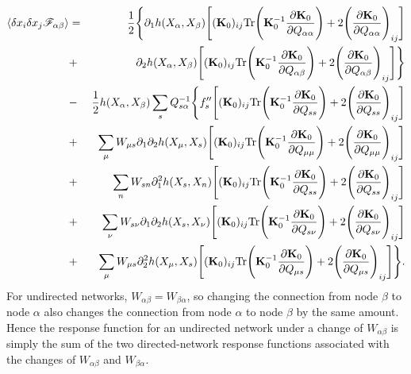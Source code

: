 \begin{eqnarray}
    \langle \delta x_i  \delta x_j{\mathscr F}_{\alpha\beta}\rangle &=&\frac{1}{2}\Bigg\{ \partial_1h(X_\alpha,X_\beta)\Bigg[ ({\bf K}_0)_{ij}\text{Tr}\Bigg({\bf K}_0^{-1} \frac{\partial {\bf K}_0}{\partial Q_{\alpha\alpha}} \Bigg) + 2\Bigg( \frac{\partial {\bf K}_0}{\partial Q_{\alpha\alpha}} \Bigg)_{ij} \Bigg]\\
    &+&\partial_2h(X_\alpha,X_\beta)\Bigg[ ({\bf K}_0)_{ij}\text{Tr}\Bigg({\bf K}_0^{-1} \frac{\partial {\bf K}_0}{\partial Q_{\alpha\beta}} \Bigg) + 2\Bigg( \frac{\partial {\bf K}_0}{\partial Q_{\alpha\beta}} \Bigg)_{ij} \Bigg]\Bigg\}\nonumber\\
    &-&\frac{1}{2}h(X_\alpha,X_\beta)\sum_s Q^{-1}_{s\alpha}\Bigg\{ f_s''\Bigg[ ({\bf K}_0)_{ij}\text{Tr}\Bigg({\bf K}_0^{-1}\frac{\partial {\bf K}_0}{\partial Q_{ss}}\Bigg)+2\Bigg( \frac{\partial {\bf K}_0}{\partial Q_{ss}} \Bigg)_{ij} \Bigg]\nonumber\\
    &+&\sum_\mu W_{\mu s}\partial_1\partial_2 h(X_\mu, X_s)\Bigg[ ({\bf K}_0)_{ij}\text{Tr}\Bigg({\bf K}_0^{-1}\frac{\partial {\bf K}_0}{\partial Q_{\mu\mu}}\Bigg)+2\Bigg( \frac{\partial {\bf K}_0}{\partial Q_{\mu\mu}} \Bigg)_{ij} \Bigg]\nonumber\\
    &+&\sum_n W_{sn}\partial_1^2 h(X_s, X_n)\Bigg[ ({\bf K}_0)_{ij}\text{Tr}\Bigg({\bf K}_0^{-1}\frac{\partial {\bf K}_0}{\partial Q_{ss}}\Bigg)+2\Bigg( \frac{\partial {\bf K}_0}{\partial Q_{ss}} \Bigg)_{ij} \Bigg]\nonumber\\
    &+&\sum_\nu W_{s\nu}\partial_1\partial_2 h(X_s, X_\nu)\Bigg[ ({\bf K}_0)_{ij}\text{Tr}\Bigg({\bf K}_0^{-1}\frac{\partial {\bf K}_0}{\partial Q_{s\nu}}\Bigg)+2\Bigg( \frac{\partial {\bf K}_0}{\partial Q_{s\nu}} \Bigg)_{ij} \Bigg]\nonumber\\
    &+&\sum_\mu W_{\mu s}\partial_2^2 h(X_\mu, X_s)\Bigg[ ({\bf K}_0)_{ij}\text{Tr}\Bigg({\bf K}_0^{-1}\frac{\partial {\bf K}_0}{\partial Q_{\mu s}}\Bigg)+2\Bigg( \frac{\partial {\bf K}_0}{\partial Q_{\mu s}} \Bigg)_{ij} \Bigg]\Bigg\}.\nonumber
\end{eqnarray}
For undirected networks, $W_{\alpha\beta}=W_{\beta\alpha}$, so changing the connection from node $\beta$ to node $\alpha$ also changes the connection from node $\alpha$ to node $\beta$ by the same amount. Hence the response function for an undirected network under a change of $W_{\alpha\beta}$ is simply the sum of the two directed-network response functions associated with the changes of $W_{\alpha\beta}$ and $W_{\beta\alpha}$.
